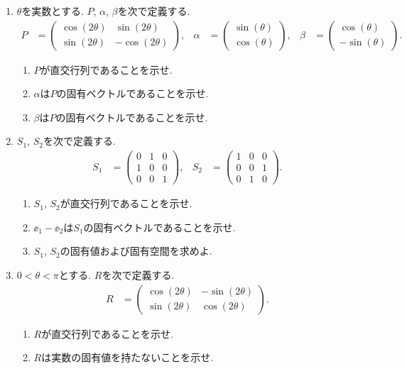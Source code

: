 \begin{enumerate}
  \item
  $\theta$を実数とする.
  $P$, $\alpha$, $\beta$を次で定義する.
  \begin{align*}
    P&=
    \begin{pmatrix}
      \cos(2\theta) & \sin(2\theta) \\
      \sin(2\theta) & -\cos(2\theta) 
    \end{pmatrix},&
    \alpha
    &=
    \begin{pmatrix}
      \sin(\theta) \\
      \cos(\theta) 
    \end{pmatrix},&
    \beta
    &=
    \begin{pmatrix}
      \cos(\theta)\\
      -\sin(\theta) 
    \end{pmatrix}.
  \end{align*}
  \begin{enumerate}
  \item $P$が直交行列であることを示せ.
  \item $\alpha$は$P$の固有ベクトルであることを示せ.
  \item $\beta$は$P$の固有ベクトルであることを示せ.
  \end{enumerate}
\item
  $S_1$, $S_2$を次で定義する.
  \begin{align*}
    S_1&=
    \begin{pmatrix}
      0&1&0\\
      1&0&0\\
      0&0&1
    \end{pmatrix},&
    S_2&=
    \begin{pmatrix}
      1&0&0\\
      0&0&1\\
      0&1&0
    \end{pmatrix}.
  \end{align*}
  \begin{enumerate}
  \item $S_1$, $S_2$が直交行列であることを示せ.
  \item $\ee_1-\ee_2$は$S_1$の固有ベクトルであることを示せ.
  \item $S_1$, $S_2$の固有値および固有空間を求めよ.
  \end{enumerate}
\item
  $0<\theta<\pi$とする.
  $R$を次で定義する.
  \begin{align*}
    R&=
    \begin{pmatrix}
      \cos(2\theta) & -\sin(2\theta) \\
      \sin(2\theta) & \cos(2\theta) 
    \end{pmatrix}.
  \end{align*}
  \begin{enumerate}
  \item $R$が直交行列であることを示せ.
  \item $R$は実数の固有値を持たないことを示せ.
  \end{enumerate}
\end{enumerate}


